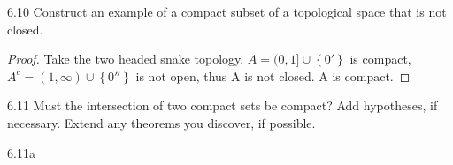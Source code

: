 \documentclass{article}
\begin{document}
\bigskip

\begin{PROB}{6.10}\label{Problem 6.10.}
    Construct an example of a compact subset of a topological space that is not closed.
\end{PROB}
\begin{proof}
    Take the two headed snake topology. 
    $A = (0, 1] \cup \left\{ 0' \right\}$ is compact, $A^c = (1, \infty) \cup \left\{ 0'' \right\}$ is not open, thus A is not closed. A is compact.  
\end{proof}

\bigskip

\begin{PROB}{6.11}\label{Problem 6.11.}
    Must the intersection of two compact sets be compact? Add hypotheses, if necessary. Extend any theorems you discover, if possible.
\end{PROB}
\begin{claim}{6.11a}\label{Claim 6.11a.}
\end{claim}

\bigskip
\end{document}
